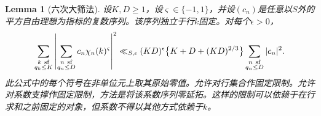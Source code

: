 \documentclass[11pt,a4paper]{article}
\numberwithin{equation}{section}
\numberwithin{figure}{section}
\newtheorem{lemma}[theorem]{Lemma}
\theoremstyle{definition}
\theoremstyle{remark}
\begin{document}
\begin{lemma}[六次大筛法]\label{lem:sextic-large-sieve}
设$K,D\ge1$，设$\varsigma\in\{-1,1\}$，并设$(c_n)$是任意以$S$外的平方自由理想为指标的复数序列。该序列独立于行$k$固定。对每个$\epsilon>0$，
\begin{equation}\label{eq:sextic-large-sieve}
 \sum_{\substack{k\ {\rm sf}\\q_k\le K}}
 \left|\sum_{\substack{n\ {\rm sf}\\q_n\le D}}
       c_n\chi_n(k)^{\varsigma}\right|^2
 \ll_{S,\epsilon}(KD)^\epsilon
       \bigl\{K+D+(KD)^{2/3}\bigr\}
       \sum_{\substack{n\ {\rm sf}\\q_n\le D}}|c_n|^2.
\end{equation}
此公式中的每个符号在非单位元上取其原始零值。允许对行集合作固定限制。允许对系数支撑作固定限制，方法是将该系数序列零延拓。这样的限制可以依赖于在行求和之前固定的对象，但系数不得以其他方式依赖于$k$。
\end{lemma}
\end{document}
